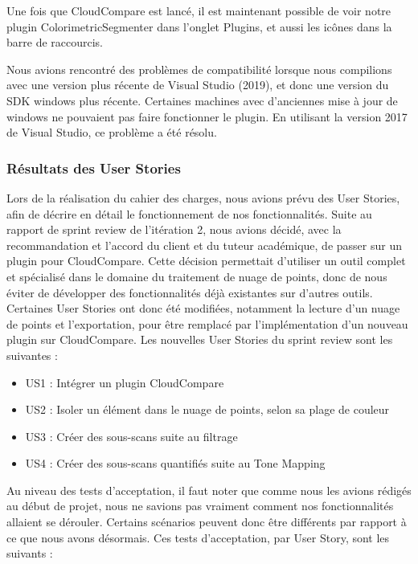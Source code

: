 \documentclass[12pt,titlepage,french]{article}
\begin{document}
Une fois que CloudCompare est lancé, il est maintenant possible de voir notre plugin ColorimetricSegmenter dans l'onglet Plugins, et aussi les icônes dans la barre de raccourcis. \newline

Nous avions rencontré des problèmes de compatibilité lorsque nous compilions avec une version plus récente de Visual Studio (2019), et donc une version du SDK windows plus récente. Certaines machines avec d'anciennes mise à jour de windows ne pouvaient pas faire fonctionner le plugin. En utilisant la version 2017 de Visual Studio, ce problème a été résolu.

\subsubsection {Résultats des User Stories}

Lors de la réalisation du cahier des charges, nous avions prévu des User Stories, afin de décrire en détail le fonctionnement de nos fonctionnalités. Suite au rapport de sprint review de l'itération 2, nous avions décidé, avec la recommandation et l'accord du client et du tuteur académique, de passer sur un plugin pour CloudCompare. Cette décision permettait d'utiliser un outil complet et spécialisé dans le domaine du traitement de nuage de points, donc de nous éviter de développer des fonctionnalités déjà existantes sur d'autres outils. Certaines User Stories ont donc été modifiées, notamment la lecture d'un nuage de points et l'exportation, pour être remplacé par l'implémentation d'un nouveau plugin sur CloudCompare. Les nouvelles User Stories du sprint review sont les suivantes :

\begin{itemize}
  \item US1 : Intégrer un plugin CloudCompare
  \item US2 : Isoler un élément dans le nuage de points, selon sa plage de couleur
  \item US3 : Créer des sous-scans suite au filtrage
  \item  US4 : Créer des sous-scans quantifiés suite au Tone Mapping
\end{itemize}

Au niveau des tests d'acceptation, il faut noter que comme nous les avions rédigés au début de projet, nous ne savions pas vraiment comment nos fonctionnalités allaient se dérouler. Certains scénarios peuvent donc être différents par rapport à ce que nous avons désormais. Ces tests d'acceptation, par User Story, sont les suivants : \\
\end{document}
